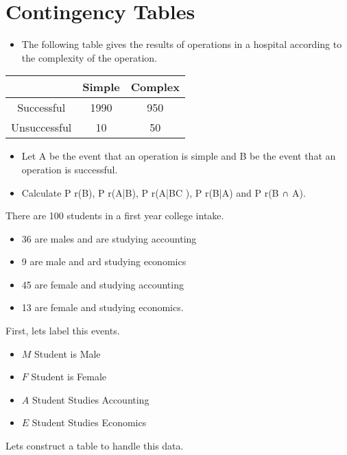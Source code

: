 	



\section{Contingency Tables}

\begin{itemize}
\item The following table gives the results of operations in a hospital according to the complexity of the
operation.
\end{itemize}

\begin{center}

\begin{tabular}{ccc}
& Simple & Complex \\ \hline
Successful & 1990 & 950 \\ \hline
Unsuccessful & 10 & 50\\ \hline
\end{tabular} 
\end{center}


\begin{itemize}
\item Let A be the event that an operation is simple and B be the event that an
operation is successful. 
\item Calculate P r(B), P r(A|B), P r(A|BC ), P r(B|A) and
P r(B ∩ A). 
\end{itemize}



There are 100 students in a first year college intake. 
\begin{itemize}
\item 36 are males and are studying accounting
\item 9 are male and ard studying economics
\item 45 are female and studying accounting
\item 13 are female and studying economics.

\end{itemize}

First, lets label this events.

\begin{itemize}
\item $M$ Student is Male
\item $F$ Student is Female
\item $A$ Student Studies Accounting
\item $E$ Student Studies Economics
\end{itemize}

Lets construct a table to handle this data.

